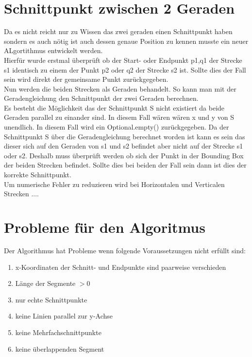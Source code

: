 \documentclass[conference]{IEEEtran}
\begin{document}
	\section{Schnittpunkt zwischen 2 Geraden }
	Da es nicht reicht nur zu Wissen das zwei geraden einen Schnittpunkt haben sondern es auch nötig ist auch dessen genaue Position zu kennen musste ein neuer ALgortithmus entwickelt werden.\\
	Hierfür wurde erstmal überprüft ob der Start- oder Endpunkt p1,q1 der Strecke s1 identisch zu einem der Punkt p2 oder q2 der Strecke s2 ist. Sollte dies der Fall sein wird direkt der gemeinsame Punkt zurückgegeben.\\
	Nun werden die beiden Strecken als Geraden behandelt. So kann man mit der Geradengleichung den Schnittpunkt der zwei Geraden berechnen.\\
	\[  \]
	Es besteht die Möglichkeit das der Schnittpunkt S nicht existiert da beide Geraden parallel zu einander sind. In diesem Fall wären wären x und y von S unendlich. In diesem Fall wird ein Optional.empty() zurückgegeben.
	Da der Schnittpunkt S über die Geradengleichung berechnet worden ist kann es sein das dieser sich auf den Geraden von s1 und s2 befindet aber nicht auf der Strecke s1 oder s2. Deshalb muss überprüft werden ob sich der Punkt in der Bounding Box der beiden Strecken befindet. Sollte dies bei beiden der Fall sein dann ist dies der korrekte Schnittpunkt.\\
	Um numerische Fehler zu reduzieren wird bei Horizontalen und Verticalen Strecken ....
	
	\section{Probleme für den Algoritmus}
	Der Algorithmus hat Probleme wenn folgende Voraussetzungen nicht erfüllt sind:
	\begin{enumerate}
		\item x-Koordinaten der Schnitt- und Endpunkte sind paarweise verschieden
		
		\item Länge der Segmente $> 0$
		
		\item nur echte Schnittpunkte
		
		\item keine Linien parallel zur y-Achse
		
		\item keine Mehrfachschnittpunkte
		
		\item keine überlappenden Segment
	\end{enumerate}
	
\end{document}
